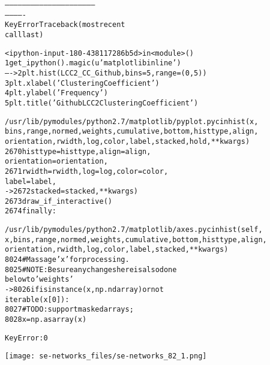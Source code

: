 \documentclass[letterpaper,10pt,english]{/usr/local/lib/python2.7/dist-packages/sphinx/texinputs/sphinxhowto}
\newenvironment{InvisibleVerbatim}
        {\begin{mdframed}[leftmargin=0.1\linewidth,innerleftmargin=3pt,innerrightmargin=3pt, userdefinedwidth=1\linewidth, linewidth=0pt, linecolor=white, usetwoside=false]}
        {\end{mdframed}}
\begin{document}
    

        
        

            
                
            \begin{alltt}

        --------------------------------------------------------------
-------------
    KeyError                                  Traceback (most recent
call last)



        <ipython-input-180-438117286b5d> in <module>()
          1 get\_ipython().magic(u'matplotlib inline')
    ----> 2 plt.hist(LCC2\_CC\_Github, bins = 5, range = (0, 5))
          3 plt.xlabel('Clustering Coefficient')
          4 plt.ylabel('Frequency')
          5 plt.title('Github LCC2 Clustering Coefficient')




        /usr/lib/pymodules/python2.7/matplotlib/pyplot.pyc in hist(x,
bins, range, normed, weights, cumulative, bottom, histtype, align,
orientation, rwidth, log, color, label, stacked, hold, **kwargs)
       2670                       histtype=histtype, align=align,
orientation=orientation,
       2671                       rwidth=rwidth, log=log, color=color,
label=label,
    -> 2672                       stacked=stacked, **kwargs)
       2673         draw\_if\_interactive()
       2674     finally:




        /usr/lib/pymodules/python2.7/matplotlib/axes.pyc in hist(self,
x, bins, range, normed, weights, cumulative, bottom, histtype, align,
orientation, rwidth, log, color, label, stacked, **kwargs)
       8024         \# Massage 'x' for processing.
       8025         \# NOTE: Be sure any changes here is also done
below to 'weights'
    -> 8026         if isinstance(x, np.ndarray) or not
iterable(x[0]):
       8027             \# TODO: support masked arrays;
       8028             x = np.asarray(x)




        KeyError: 0

\end{alltt}
        
            
                \begin{InvisibleVerbatim}
                \vspace{-0.5\baselineskip}
    \begin{center}
    \texttt{[image: se-networks\_files/se-networks\_82\_1.png]}
    \par
    \end{center}
    
            \end{InvisibleVerbatim}
            
\end{document}
